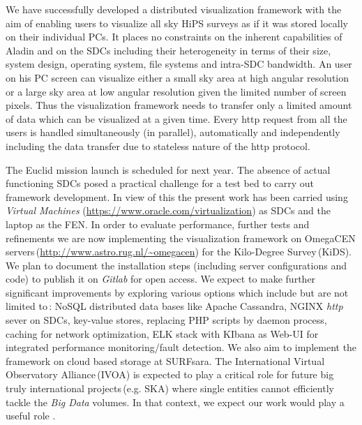 \documentclass[11pt,twoside]{article}
\begin{document}
We have successfully developed a distributed visualization framework with the aim of enabling users to visualize all sky HiPS surveys as if it  was stored locally on their individual PCs. 
It places no constraints on the inherent  capabilities of Aladin and on the SDCs including their heterogeneity in terms of their size, system design, operating system, file systems and intra-SDC bandwidth. An user on his PC screen can visualize either a small sky area at high angular resolution or a large sky area at low angular resolution given the limited number of screen pixels. Thus the visualization framework needs to transfer only a limited amount of data which can  be visualized at a given time. Every http request from all the users  is handled simultaneously (in parallel), automatically and independently including the data transfer due to stateless nature of the http protocol.  

The Euclid mission launch is scheduled for next year. The absence of  actual functioning SDCs posed a practical challenge for a test bed to carry out framework development. In view of this the present work has been carried using  {\it Virtual Machines} (\url{https://www.oracle.com/virtualization}) as  SDCs and the laptop as the FEN.  In order to evaluate performance, further tests and refinements we are  now implementing the visualization framework on OmegaCEN servers\,(\url{http://www.astro.rug.nl/~omegacen}) for the  Kilo-Degree Survey\,(KiDS). 
We plan  to document the installation steps (including server configurations and code) to publish it on {\it Gitlab} for open access.  We expect to make  further significant improvements by  exploring various options which include but are not limited to\,: NoSQL distributed data bases like  Apache Cassandra, NGINX {\it{http}} sever on SDCs,  key-value stores, replacing PHP scripts by daemon process, caching for network optimization, ELK stack with KIbana as Web-UI for integrated performance monitoring/fault detection. We also aim to implement the framework on cloud based storage at SURFsara.   The International Virtual Observatory Alliance\,(IVOA) is expected to play a critical role for future big truly international projects\,(e.g. SKA) where  single entities cannot efficiently tackle the {\it Big Data} volumes. In that context, we expect  our work would play  a useful role . 



\end{document}
